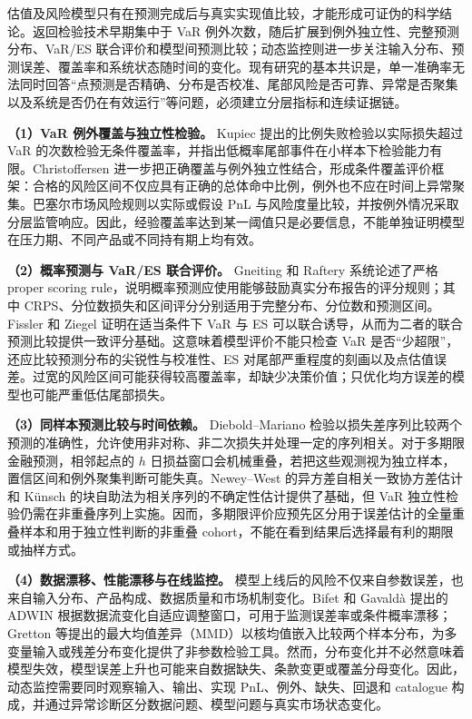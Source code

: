 估值及风险模型只有在预测完成后与真实实现值比较，才能形成可证伪的科学结论。返回检验技术早期集中于 VaR 例外次数，随后扩展到例外独立性、完整预测分布、VaR/ES 联合评价和模型间预测比较；动态监控则进一步关注输入分布、预测误差、覆盖率和系统状态随时间的变化。现有研究的基本共识是，单一准确率无法同时回答“点预测是否精确、分布是否校准、尾部风险是否可靠、异常是否聚集以及系统是否仍在有效运行”等问题，必须建立分层指标和连续证据链。

\textbf{（1）VaR 例外覆盖与独立性检验。}
Kupiec 提出的比例失败检验以实际损失超过 VaR 的次数检验无条件覆盖率，并指出低概率尾部事件在小样本下检验能力有限\cite{kupiec_1995}。Christoffersen 进一步把正确覆盖与例外独立性结合，形成条件覆盖评价框架：合格的风险区间不仅应具有正确的总体命中比例，例外也不应在时间上异常聚集\cite{christoffersen_1998}。巴塞尔市场风险规则以实际或假设 PnL 与风险度量比较，并按例外情况采取分层监管响应\cite{bcbs_2019_market_risk}。因此，经验覆盖率达到某一阈值只是必要信息，不能单独证明模型在压力期、不同产品或不同持有期上均有效。

\textbf{（2）概率预测与 VaR/ES 联合评价。}
Gneiting 和 Raftery 系统论述了严格 proper scoring rule，说明概率预测应使用能够鼓励真实分布报告的评分规则；其中 CRPS、分位数损失和区间评分分别适用于完整分布、分位数和预测区间\cite{gneiting_raftery_2007}。Fissler 和 Ziegel 证明在适当条件下 VaR 与 ES 可以联合诱导，从而为二者的联合预测比较提供一致评分基础\cite{fissler_ziegel_2016}。这意味着模型评价不能只检查 VaR 是否“少超限”，还应比较预测分布的尖锐性与校准性、ES 对尾部严重程度的刻画以及点估值误差。过宽的风险区间可能获得较高覆盖率，却缺少决策价值；只优化均方误差的模型也可能严重低估尾部损失。

\textbf{（3）同样本预测比较与时间依赖。}
Diebold--Mariano 检验以损失差序列比较两个预测的准确性，允许使用非对称、非二次损失并处理一定的序列相关\cite{diebold_mariano_1995}。对于多期限金融预测，相邻起点的 \(h\) 日损益窗口会机械重叠，若把这些观测视为独立样本，置信区间和例外聚集判断可能失真。Newey--West 的异方差自相关一致协方差估计\cite{newey_west_1987}和 K{\"u}nsch 的块自助法\cite{kunsch_1989}为相关序列的不确定性估计提供了基础，但 VaR 独立性检验仍需在非重叠序列上实施。因而，多期限评价应预先区分用于误差估计的全量重叠样本和用于独立性判断的非重叠 cohort，不能在看到结果后选择最有利的期限或抽样方式。

\textbf{（4）数据漂移、性能漂移与在线监控。}
模型上线后的风险不仅来自参数误差，也来自输入分布、产品构成、数据质量和市场机制变化。Bifet 和 Gavald{\`a} 提出的 ADWIN 根据数据流变化自适应调整窗口，可用于监测误差率或条件概率漂移\cite{bifet_gavalda_2007}；Gretton 等提出的最大均值差异（MMD）以核均值嵌入比较两个样本分布，为多变量输入或残差分布变化提供了非参数检验工具\cite{gretton_2012}。然而，分布变化并不必然意味着模型失效，模型误差上升也可能来自数据缺失、条款变更或覆盖分母变化。因此，动态监控需要同时观察输入、输出、实现 PnL、例外、缺失、回退和 catalogue 构成，并通过异常诊断区分数据问题、模型问题与真实市场状态变化。

